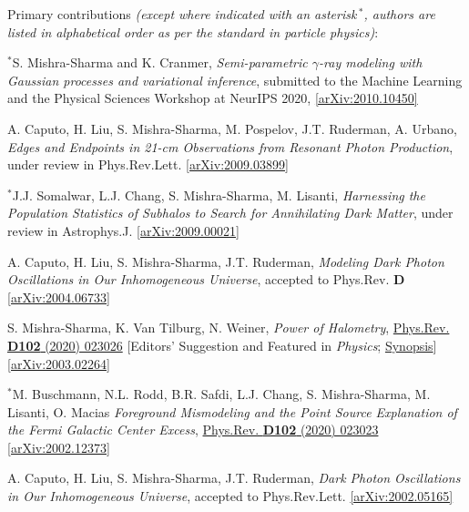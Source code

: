 \documentclass[11pt]{article}
\newenvironment{packed_enumerate}[1][]{
\begin{etaremune}[#1]
  \setlength{\itemsep}{3pt}
  \setlength{\parskip}{0pt}
  \setlength{\parsep}{0pt}}{\end{etaremune}
}
\begin{document}
\noindent
Primary contributions \emph{(except where indicated with an asterisk\,$^*$, authors are listed in alphabetical order as per the standard in particle physics)}:

\begin{packed_enumerate}[start=24]

\item $^*$S. Mishra-Sharma and K. Cranmer, \emph{Semi-parametric $\gamma$-ray modeling with Gaussian processes and variational inference}, submitted to the Machine Learning and the Physical Sciences Workshop at NeurIPS 2020,  \href{https://arxiv.org/abs/2010.10450}{[arXiv:2010.10450]}

\item A. Caputo, H. Liu, S. Mishra-Sharma, M. Pospelov, J.T. Ruderman, A. Urbano, \emph{Edges and Endpoints in 21-cm Observations from Resonant Photon Production}, under review in Phys.Rev.Lett. \href{https://arxiv.org/abs/2009.03899}{[arXiv:2009.03899]}

\item $^*$J.J. Somalwar, L.J. Chang, S. Mishra-Sharma, M. Lisanti, \emph{Harnessing the Population Statistics of Subhalos to Search for Annihilating Dark Matter}, under review in Astrophys.J. \href{https://arxiv.org/abs/2009.00021}{[arXiv:2009.00021]}

\item A. Caputo, H. Liu, S. Mishra-Sharma, J.T. Ruderman, \emph{Modeling Dark Photon Oscillations in Our Inhomogeneous Universe}, accepted to Phys.Rev. \textbf{D}  \href{https://arxiv.org/abs/2004.06733}{[arXiv:2004.06733]}

\item S. Mishra-Sharma, K. Van Tilburg, N. Weiner, \emph{Power of Halometry}, \href{https://journals.aps.org/prd/abstract/10.1103/PhysRevD.102.023026}{Phys.Rev. \textbf{D102} (2020) 023026} [Editors' Suggestion and Featured in \emph{Physics}; \href{https://physics.aps.org/articles/v13/s98}{Synopsis}]  \href{https://arxiv.org/abs/2003.02264}{[arXiv:2003.02264]}

\item $^*$M. Buschmann, N.L. Rodd, B.R. Safdi, L.J. Chang, S. Mishra-Sharma, M. Lisanti, O. Macias \emph{Foreground Mismodeling and the Point Source Explanation of the Fermi Galactic Center Excess},  \href{https://journals.aps.org/prd/abstract/10.1103/PhysRevD.102.023023}{Phys.Rev. \textbf{D102} (2020) 023023} \href{https://arxiv.org/abs/2002.12373}{[arXiv:2002.12373]} 

\item A. Caputo, H. Liu, S. Mishra-Sharma, J.T. Ruderman, \emph{Dark Photon Oscillations in Our Inhomogeneous Universe}, accepted to Phys.Rev.Lett. \href{https://arxiv.org/abs/2002.05165}{[arXiv:2002.05165]}


\end{packed_enumerate}
\end{document}
